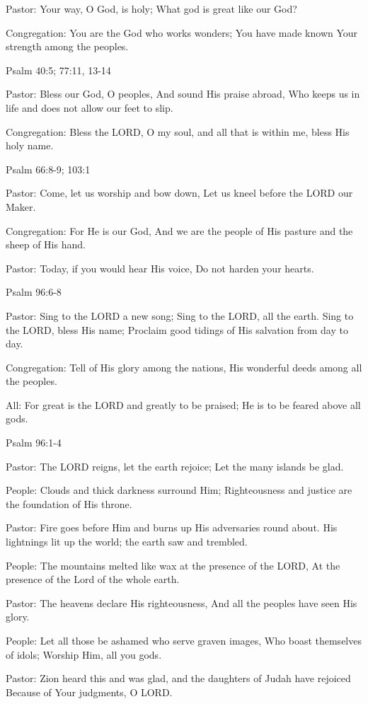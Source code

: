 \documentclass[]{book}
\begin{document}
Pastor: Your way, O God, is holy; What god is great like our God?

Congregation: You are the God who works wonders; You have made known
Your strength among the peoples.

Psalm 40:5; 77:11, 13-14 \textbar{}

Pastor: Bless our God, O peoples, And sound His praise abroad, Who keeps
us in life and does not allow our feet to slip.

Congregation: Bless the LORD, O my soul, and all that is within me,
bless His holy name.

Psalm 66:8-9; 103:1 \textbar{}

Pastor: Come, let us worship and bow down, Let us kneel before the LORD
our Maker.

Congregation: For He is our God, And we are the people of His pasture
and the sheep of His hand.

Pastor: Today, if you would hear His voice, Do not harden your hearts.

Psalm 96:6-8 \textbar{}

Pastor: Sing to the LORD a new song; Sing to the LORD, all the earth.
Sing to the LORD, bless His name; Proclaim good tidings of His salvation
from day to day.

Congregation: Tell of His glory among the nations, His wonderful deeds
among all the peoples.

All: For great is the LORD and greatly to be praised; He is to be feared
above all gods.

Psalm 96:1-4

Pastor: The LORD reigns, let the earth rejoice; Let the many islands be
glad.

People: Clouds and thick darkness surround Him; Righteousness and
justice are the foundation of His throne.

Pastor: Fire goes before Him and burns up His adversaries round about.
His lightnings lit up the world; the earth saw and trembled.

People: The mountains melted like wax at the presence of the LORD, At
the presence of the Lord of the whole earth.

Pastor: The heavens declare His righteousness, And all the peoples have
seen His glory.

People: Let all those be ashamed who serve graven images, Who boast
themselves of idols; Worship Him, all you gods.

Pastor: Zion heard this and was glad, and the daughters of Judah have
rejoiced Because of Your judgments, O LORD.
\end{document}
